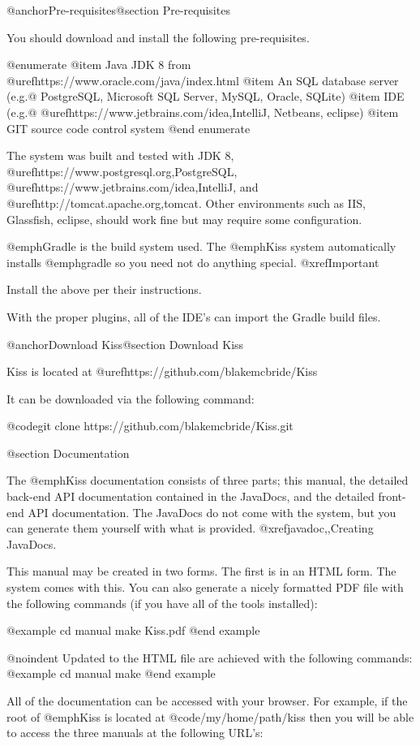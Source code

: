 @anchor{Pre-requisites}@section Pre-requisites

You should download and install the following pre-requisites.

@enumerate
@item
Java JDK 8 from @uref{https://www.oracle.com/java/index.html}
@item
An SQL database server (e.g.@ PostgreSQL, Microsoft SQL Server, MySQL, Oracle, SQLite)
@item
IDE (e.g.@ @uref{https://www.jetbrains.com/idea,IntelliJ}, Netbeans, eclipse)
@item
GIT source code control system
@end enumerate

The system was built and tested with JDK 8, @uref{https://www.postgresql.org,PostgreSQL}, @uref{https://www.jetbrains.com/idea,IntelliJ}, and 
@uref{http://tomcat.apache.org,tomcat}.  Other environments such as IIS, Glassfish, eclipse, should work fine but may require some configuration.

@emph{Gradle} is the build system used.  The @emph{Kiss} system
automatically installs @emph{gradle} so you need not do anything
special.  @xref{Important}

Install the above per their instructions.

With the proper plugins, all of the IDE's can import the Gradle build files.

@anchor{Download Kiss}@section Download Kiss


Kiss is located at @uref{https://github.com/blakemcbride/Kiss}

It can be downloaded via the following command:

@code{git clone https://github.com/blakemcbride/Kiss.git}

@section Documentation

The @emph{Kiss} documentation consists of three parts; this manual, the detailed back-end API documentation contained in the JavaDocs,
and the detailed front-end API documentation.
The JavaDocs do not come with the system, but you can generate them yourself with what is provided.  @xref{javadoc,,Creating JavaDocs}.

This manual may be created in two forms.  The first is in an HTML
form.  The system comes with this.  You can also generate a nicely
formatted PDF file with the following commands (if you have all of the tools installed):

@example
cd manual
make Kiss.pdf
@end example

@noindent
Updated to the HTML file are achieved with the following commands:
@example
cd manual
make
@end example

All of the documentation can be accessed with your browser.  For example,
if the root of @emph{Kiss} is located at @code{/my/home/path/kiss} then you will be able to access the three
manuals at the following URL's:

